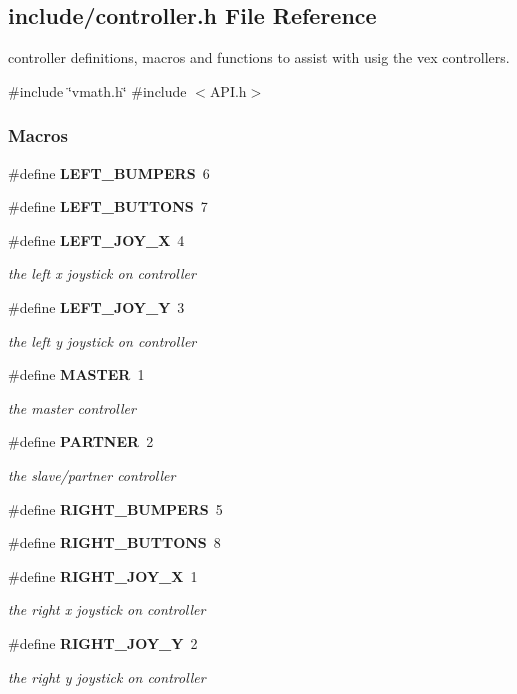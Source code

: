 \subsection{include/controller.h File Reference}
\label{controller_8h}


controller definitions, macros and functions to assist with usig the vex controllers.  


{\ttfamily \#include \char`\"{}vmath.\+h\char`\"{}}\newline
{\ttfamily \#include $<$A\+P\+I.\+h$>$}\newline
\subsubsection*{Macros}
\begin{DoxyCompactItemize}
\item 
\#define \textbf{ L\+E\+F\+T\+\_\+\+B\+U\+M\+P\+E\+RS}~6
\item 
\#define \textbf{ L\+E\+F\+T\+\_\+\+B\+U\+T\+T\+O\+NS}~7
\item 
\#define \textbf{ L\+E\+F\+T\+\_\+\+J\+O\+Y\+\_\+X}~4
\begin{DoxyCompactList}\small\item\em the left x joystick on controller \end{DoxyCompactList}\item 
\#define \textbf{ L\+E\+F\+T\+\_\+\+J\+O\+Y\+\_\+Y}~3
\begin{DoxyCompactList}\small\item\em the left y joystick on controller \end{DoxyCompactList}\item 
\#define \textbf{ M\+A\+S\+T\+ER}~1
\begin{DoxyCompactList}\small\item\em the master controller \end{DoxyCompactList}\item 
\#define \textbf{ P\+A\+R\+T\+N\+ER}~2
\begin{DoxyCompactList}\small\item\em the slave/partner controller \end{DoxyCompactList}\item 
\#define \textbf{ R\+I\+G\+H\+T\+\_\+\+B\+U\+M\+P\+E\+RS}~5
\item 
\#define \textbf{ R\+I\+G\+H\+T\+\_\+\+B\+U\+T\+T\+O\+NS}~8
\item 
\#define \textbf{ R\+I\+G\+H\+T\+\_\+\+J\+O\+Y\+\_\+X}~1
\begin{DoxyCompactList}\small\item\em the right x joystick on controller \end{DoxyCompactList}\item 
\#define \textbf{ R\+I\+G\+H\+T\+\_\+\+J\+O\+Y\+\_\+Y}~2
\begin{DoxyCompactList}\small\item\em the right y joystick on controller \end{DoxyCompactList}\end{DoxyCompactItemize}
